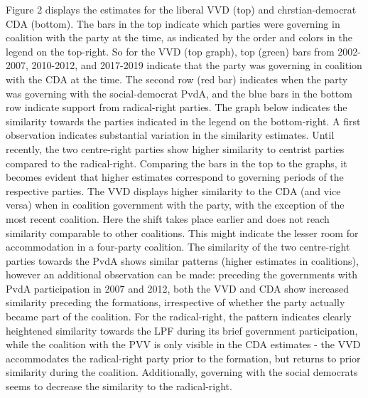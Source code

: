 \documentclass{article}
\begin{document}
Figure 2 displays the estimates for the liberal VVD (top) and chrstian-democrat CDA (bottom). The bars in the top indicate which parties were governing in coalition with the party at the time, as indicated by the order and colors in the legend on the top-right. So for the VVD (top graph), top (green) bars from 2002-2007, 2010-2012, and 2017-2019 indicate that the party was governing in coalition with the CDA at the time. The second row (red bar) indicates when the party was governing with the social-democrat PvdA, and the blue bars in the bottom row indicate support from radical-right parties. The graph below indicates the similarity towards the parties indicated in the legend on the bottom-right. A first observation indicates substantial variation in the similarity estimates. Until recently, the two centre-right parties show higher similarity to centrist parties compared to the radical-right. Comparing the bars in the top to the graphs, it becomes evident that higher estimates correspond to governing periods of the respective parties. The VVD displays higher similarity to the CDA (and vice versa) when in coalition government with the party, with the exception of the most recent coalition. Here the shift takes place earlier and does not reach similarity comparable to other coalitions. This might indicate the lesser room for accommodation in a four-party coalition. The similarity of the two centre-right parties towards the PvdA shows similar patterns (higher estimates in coalitions), however an additional observation can be made: preceding the governments with PvdA participation in 2007 and 2012, both the VVD and CDA show increased similarity preceding the formations, irrespective of whether the party actually became part of the coalition. For the radical-right, the pattern indicates clearly heightened similarity towards the LPF during its brief government participation, while the coalition with the PVV is only visible in the CDA estimates - the VVD accommodates the radical-right party prior to the formation, but returns to prior similarity during the coalition. Additionally, governing with the social democrats seems to decrease the similarity to the radical-right. \par
\end{document}
